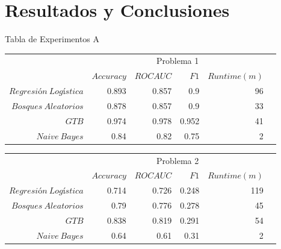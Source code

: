 \documentclass[xcolor=x11names]{beamer}
\newcommand{\ra}[1]{\renewcommand{\arraystretch}{#1}}
\begin{document}
\section{Resultados y Conclusiones}


\begin{frame}{Tabla de Experimentos A}

	\begin{table}[htp]\centering
	\footnotesize
		\ra{1.3}
		\begin{tabular}{@{}rr@{\hskip 0.3cm}r@{\hskip 0.3cm}r@{\hskip 0.3cm}rc@{}} \toprule
			&  \multicolumn{4}{c}{Problema 1} \\
			\cmidrule{2-5}
			& $Accuracy$ & $ROC AUC$ & $F1$ & $Runtime  (m)$ \\ \midrule
			$Regresión \ Logística$     & 0.893 & 0.857 & 0.9   & 96\\
			$Bosques \ Aleatorios$            & 0.878 & 0.857 & 0.9  & 33 \\
			$GTB$ & 0.974 & 0.978 & 0.952 & 41  \\
			$Naive \ Bayes$               & 0.84  & 0.82  & 0.75  & 2  \\

			\bottomrule
		\end{tabular}


		\ra{1.3}
		\begin{tabular}{@{}rr@{\hskip 0.3cm}r@{\hskip 0.3cm}r@{\hskip 0.3cm}rc@{}} \toprule
			&  \multicolumn{4}{c}{Problema 2} \\
			\cmidrule{2-5}
			& $Accuracy$ & $ROC AUC$ & $F1$ & $Runtime  (m)$ \\ \midrule
			$Regresión \ Logística$     & 0.714 & 0.726 & 0.248 & 119 \\
			$Bosques \ Aleatorios$            & 0.79  & 0.776 & 0.278 & 45  \\
			$GTB$ & 0.838 & 0.819 & 0.291 & 54 \\
			$Naive \ Bayes$               & 0.64  & 0.61  & 0.31  & 2   \\

			\bottomrule
		\end{tabular}
	\end{table}

\end{frame}
\end{document}

